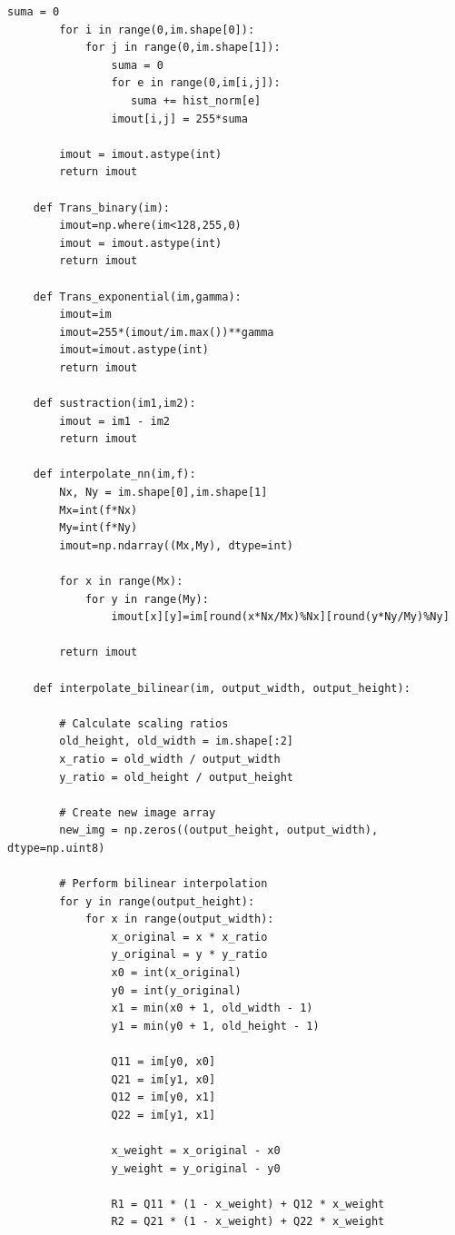 \documentclass[11pt,twocolumn,twoside]{opticajnl}
\begin{document}
\begin{onecolumn}
\begin{lstlisting}[style=mystyle]
        suma = 0
        for i in range(0,im.shape[0]):
            for j in range(0,im.shape[1]):
                suma = 0
                for e in range(0,im[i,j]):
                   suma += hist_norm[e]
                imout[i,j] = 255*suma
    
        imout = imout.astype(int)
        return imout
    
    def Trans_binary(im):
        imout=np.where(im<128,255,0)
        imout = imout.astype(int)
        return imout
    
    def Trans_exponential(im,gamma):
        imout=im
        imout=255*(imout/im.max())**gamma
        imout=imout.astype(int)
        return imout
    
    def sustraction(im1,im2):
        imout = im1 - im2
        return imout
    
    def interpolate_nn(im,f):
        Nx, Ny = im.shape[0],im.shape[1]
        Mx=int(f*Nx)
        My=int(f*Ny)
        imout=np.ndarray((Mx,My), dtype=int)
    
        for x in range(Mx):
            for y in range(My):
                imout[x][y]=im[round(x*Nx/Mx)%Nx][round(y*Ny/My)%Ny]
    
        return imout
    
    def interpolate_bilinear(im, output_width, output_height):
    
        # Calculate scaling ratios
        old_height, old_width = im.shape[:2]
        x_ratio = old_width / output_width
        y_ratio = old_height / output_height
    
        # Create new image array
        new_img = np.zeros((output_height, output_width), dtype=np.uint8)
    
        # Perform bilinear interpolation
        for y in range(output_height):
            for x in range(output_width):
                x_original = x * x_ratio
                y_original = y * y_ratio
                x0 = int(x_original)
                y0 = int(y_original)
                x1 = min(x0 + 1, old_width - 1)
                y1 = min(y0 + 1, old_height - 1)
    
                Q11 = im[y0, x0]
                Q21 = im[y1, x0]
                Q12 = im[y0, x1]
                Q22 = im[y1, x1]
    
                x_weight = x_original - x0
                y_weight = y_original - y0
    
                R1 = Q11 * (1 - x_weight) + Q12 * x_weight
                R2 = Q21 * (1 - x_weight) + Q22 * x_weight
    

\end{lstlisting}
\end{onecolumn}
\end{document}
